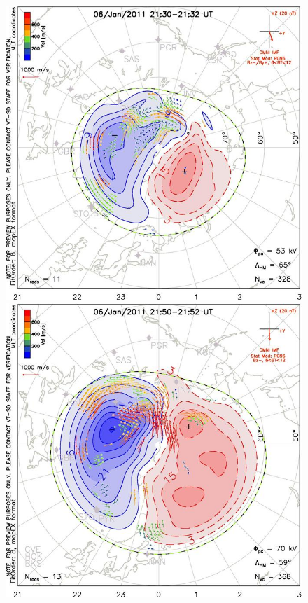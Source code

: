\documentclass[norsk,a4paper,11pt]{article}
\begin{document}
\begin{multicols}{2}
\begin{figure}[H]
	\includegraphics[scale = 0.9]{Figures/Superdarn/superdarn_21_30.jpg}
	\includegraphics[scale = 0.9]{Figures/Superdarn/superdarn_21_52.jpg}

\end{figure}
\end{multicols}
\end{document}

